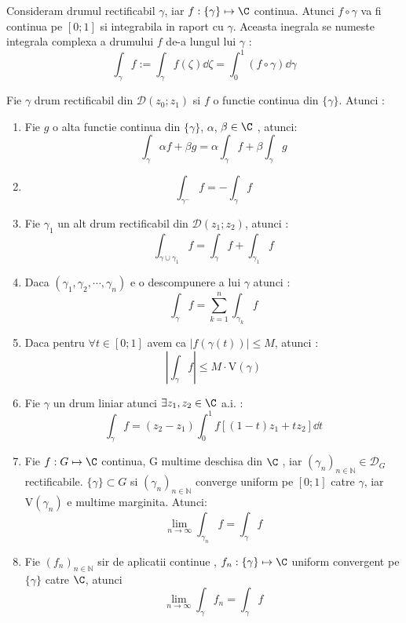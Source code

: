 \begin{definition}
    Consideram drumul rectificabil $\gamma$, iar $f:\{\gamma\} \mapsto \C$ continua.
    Atunci $f \circ \gamma$ va fi continua pe $[0;1]$ si integrabila in raport cu $\gamma$.
    Aceasta inegrala se numeste integrala complexa a drumului $f$ de-a lungul lui $\gamma$ : 
    \begin{equation*}
        \int_{\gamma} f := \int_{\gamma} f(\zeta) \dd \zeta = \int_0^1 (f \circ \gamma) \dd \gamma
    \end{equation*}
\end{definition}

\begin{theorem}
    Fie $\gamma$ drum rectificabil din $\mathcal{D}(z_0;z_1)$ si $f$ o functie continua din $\{\gamma\}$. Atunci : 
    \begin{enumerate}
        \item Fie $g$ o alta functie continua din $\{\gamma\}$, $\alpha$, $\beta \in \C$ 
            , atunci:
            \[
                \int_{\gamma} \alpha f + \beta g  = \alpha \int_{\gamma} f + \beta \int_{\gamma} g
            \]
        \item 
            \[
                \int_{\gamma^{-}} f = -\int_{\gamma} f
            \]
        \item Fie $\gamma_1$ un alt drum rectificabil din $\mathcal{D}(z_1;z_2)$, atunci :
            \[
                \int_{\gamma \cup \gamma_1} f = \int_{\gamma} f + \int_{\gamma_1} f
            \]
        \item Daca $(\gamma_1, \gamma_2, \cdots, \gamma_n)$ e o descompunere a lui $\gamma$ atunci :
            \[
                \int_{\gamma} f = \sum_{k=1}^{n} \int_{\gamma_k} f
            \]
        \item Daca pentru $\forall t \in [0;1]$ avem ca $|f(\gamma(t))| \leq M$, atunci :
            \[
                \left | \int_{\gamma} f \right | \leq M \cdot \mathrm{V}(\gamma)
            \]
        \item Fie $\gamma$ un drum liniar atunci $\exists z_1, z_2 \in \C$ a.i. :
            \[
                 \int_{\gamma} f = (z_2 -z_1) \int_0^1 f[(1-t)z_1 + tz_2] \dd t
            \]
        \item Fie $f:G\mapsto \C$ continua, G multime deschisa din $\C$ ,
            iar $(\gamma_n)_{n\in\mathbb{N}} \in \mathcal{D}_G$ rectificabile.
            $\{\gamma\} \subset G$ si $(\gamma_n)_{n\in\mathbb{N}}$ converge uniform pe $[0;1]$ catre $\gamma$, iar
            $\mathrm{V}(\gamma_n)$ e multime marginita. Atunci:
            \[
                \lim_{n\to \infty} \int_{\gamma_n} f = \int_{\gamma} f
            \]
        \item Fie $(f_n)_{n\in\mathbb{N}}$ sir de aplicatii continue ,
            $f_n : \{\gamma\} \mapsto \C$ uniform convergent pe $\{\gamma\}$ catre $\C$, atunci
            \[
                \lim_{n\to\infty} \int_{\gamma} f_n = \int_{\gamma} f
            \]
    \end{enumerate}
\end{theorem}


